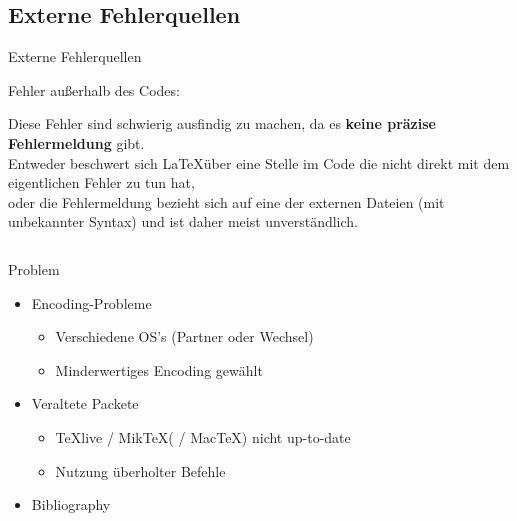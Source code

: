 \subsection{Externe Fehlerquellen}
\begin{frame}[c]
	\begin{center}
		\large Externe Fehlerquellen
	\end{center}
\end{frame}
\begin{frame}{Fehler außerhalb des Codes:}
  \begin{outputbox}
    Diese Fehler sind schwierig ausfindig zu machen, da es \textbf{keine präzise Fehlermeldung} gibt.\\
    Entweder beschwert sich \LaTeX über eine Stelle im Code die nicht direkt mit dem eigentlichen Fehler zu tun hat,\\
    oder die Fehlermeldung bezieht sich auf eine der externen Dateien (mit unbekannter Syntax) und ist daher meist unverständlich.
  \end{outputbox}

  \begin{columns}

    \begin{block}{Problem}
      \begin{itemize}
      \item<2-> Encoding-Probleme
        \begin{itemize}
        \item<3-> Verschiedene OS's (Partner oder Wechsel)
        \item<3-> Minderwertiges Encoding gewählt
        \end{itemize}
      \item<4-> Veraltete Packete
        \begin{itemize}
        \item<5-> {\TeX}live / Mik\TeX ( / Mac\TeX ) nicht up-to-date
        \item<7-> Nutzung überholter Befehle
        \end{itemize}
      \item<9-> Bibliography
      \end{itemize}
    \end{block}
    

\end{columns}
\end{frame}
